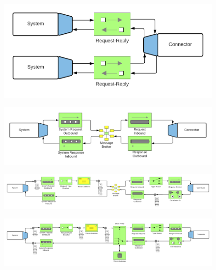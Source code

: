 \begin{figure}[h]
    \centering
    \includegraphics[scale=0.15]{Diagrams/Integration Architecture 1/Technological Integration/Connector/2. Multiple Systems.png}
\end{figure}

\begin{figure}[h]
    \centering
    \includegraphics[scale=0.15]{Diagrams/Integration Architecture 1/Technological Integration/Connector/3. Routing.png}
\end{figure}

\begin{figure}[h]
    \centering
    \includegraphics[scale=0.15]{Diagrams/Integration Architecture 1/Technological Integration/Connector/4. Routing Detail.png}
\end{figure}

\begin{figure}[h]
    \centering
    \includegraphics[scale=0.15]{Diagrams/Integration Architecture 1/Technological Integration/Connector/5. Proxy.png}
\end{figure}

